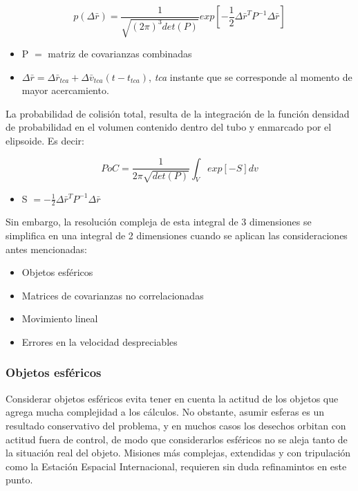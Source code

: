 \begin{equation}
 p(\Delta \bar{r})=\frac{1}{\sqrt{(2 \pi)^{3} det(P)}} exp [-\frac{1}{2}\Delta \bar{r}^{T}P^{-1}\Delta \bar{r}]
 \label{eq:densidadProbabilidad}
\end{equation}

\begin{itemize}
 \item P $=$ matriz de covarianzas combinadas
 \item $\Delta \bar{r} = \Delta \bar{r}_{tca} + \Delta \bar{v}_{tca}(t-t_{tca})$, {\it{tca}} instante que se corresponde al momento de mayor acercamiento. 
\end{itemize}

La probabilidad de colisi\'on total, resulta de la integraci\'on de la funci\'on densidad de probabilidad en el volumen contenido dentro del tubo y enmarcado por el elipsoide. Es decir: 

\begin{equation}
 PoC=\frac{1}{2 \pi \sqrt{det(P)}} \int_{V} exp [-S] dv
 \label{eq:pocintegralVolumen}
\end{equation}

\begin{itemize}
 \item S $= -\frac{1}{2}\Delta \bar{r}^{T}P^{-1}\Delta \bar{r}$
\end{itemize}

Sin embargo, la resoluci\'on compleja de esta integral de 3 dimensiones se simplifica en una integral de 2 dimensiones cuando se aplican las consideraciones antes mencionadas: 

\begin{itemize}
 \item Objetos esf\'ericos
 \item Matrices de covarianzas no correlacionadas
 \item Movimiento lineal
 \item Errores en la velocidad despreciables
\end{itemize} 

\subsubsection*{Objetos esf\'ericos}
Considerar objetos esf\'ericos evita tener en cuenta la actitud de los objetos que agrega mucha complejidad a los c\'alculos. No obstante, asumir esferas es un resultado conservativo del problema, y en muchos casos los desechos orbitan con actitud fuera de control, de modo que considerarlos esf\'ericos no se aleja tanto de la situaci\'on real del objeto. Misiones m\'as complejas, extendidas y con tripulaci\'on como la Estaci\'on Espacial Internacional, requieren sin duda refinamintos en este punto. 

